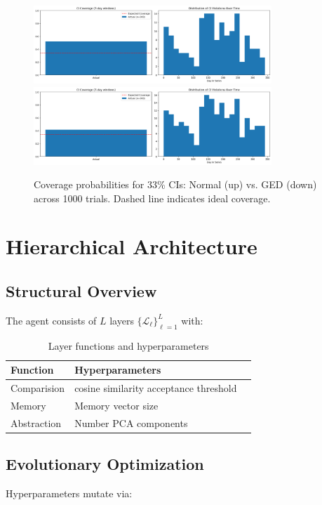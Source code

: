 \documentclass[12pt]{article}
\begin{document}
\begin{figure}[h]
    \centering
    \includegraphics[width=0.8\textwidth]{NORM.png}
    \includegraphics[width=0.8\textwidth]{GED.png}
    \caption{Coverage probabilities for 33\% CIs: Normal (up) vs. GED (down) across 1000 trials. Dashed line indicates ideal coverage.}
    \label{fig:ci}
\end{figure}

\section{Hierarchical Architecture}
\label{sec:architecture}

\subsection{Structural Overview}
The agent consists of $L$ layers $\{\mathscr{L}_\ell\}_{\ell=1}^L$ with:

\begin{table}[h]
\centering
\caption{Layer functions and hyperparameters}
\label{tab:layers}
\begin{tabular}{lll}
\toprule
\textbf{Function} & \textbf{Hyperparameters} \\
\midrule
Comparision & cosine similarity acceptance threshold \\
Memory & Memory vector size \\
Abstraction & Number PCA components \\
\bottomrule
\end{tabular}
\end{table}

\subsection{Evolutionary Optimization}
Hyperparameters mutate via:
\end{document}
